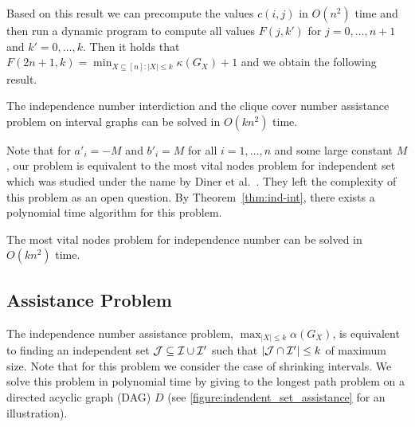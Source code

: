 Based on this result we can precompute the values $c(i,j)$ in $O(n^2)$ time and 
then run a dynamic program to compute all values $F(j,k')$ for $j=0,\dots,n+1$ and 
$k'=0,\dots,k$. Then it holds that $F(2n+1,k) = \min_{X \subseteq [n] \colon |X| \leq k} \kappa(G_X) + 1$
and we obtain the following result.

\begin{theorem}\label{thm:ind-int}
    The independence number interdiction and the clique cover number assistance problem on interval graphs can be solved in $O(k n^2)$ time.
\end{theorem}

Note that for $a'_i = -M$ and $b'_i = M$ for all $i=1,\dots,n$ and some large constant $M$, our 
problem is equivalent to the most vital nodes problem for independent set which was studied 
under the name 
by Diner et al.~\cite{diner2018contractionDeletionBlockers}. They left the complexity 
of this problem as an open question. By Theorem~\ref{thm:ind-int}, there exists 
a polynomial time algorithm for this problem.
\begin{corollary}
    The most vital nodes problem for independence number  can be solved in $O(k n^2)$ time.
\end{corollary}

\subsection{Assistance Problem}
\label{subsec:ind-assistance}

The independence number assistance problem, $\max_{|X| \leq k} \alpha(G_X)$,
is equivalent to finding an independent set $\mathcal{J} \subseteq \mathcal{I} \cup \mathcal{I}'$ such that 
$ |\mathcal{J} \cap \mathcal{I}'| \leq k$ of maximum size. Note that for this problem we consider the 
case of shrinking intervals. We solve this problem in 
polynomial time by giving  to the longest path problem on a directed acyclic graph (DAG) $D$
(see \cref{figure:indendent_set_assistance} for an illustration).

